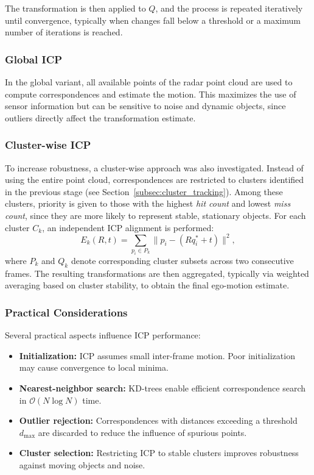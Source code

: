 The transformation is then applied to $Q$, and the process is repeated iteratively until convergence, typically when changes fall below a threshold or a maximum number of iterations is reached.

\subsubsection*{Global ICP}
In the global variant, all available points of the radar point cloud are used to compute correspondences and estimate the motion. 
This maximizes the use of sensor information but can be sensitive to noise and dynamic objects, since outliers directly affect the transformation estimate.

\subsubsection*{Cluster-wise ICP}
To increase robustness, a cluster-wise approach was also investigated. 
Instead of using the entire point cloud, correspondences are restricted to clusters identified in the previous stage (see Section~\ref{subsec:cluster_tracking}). 
Among these clusters, priority is given to those with the highest \emph{hit count} and lowest \emph{miss count}, since they are more likely to represent stable, stationary objects. 
For each cluster $C_k$, an independent ICP alignment is performed:
\begin{equation}
    E_k(R,t) = \sum_{p_i \in P_k} \lVert p_i - (R q^*_i + t) \rVert^2,
\end{equation}
where $P_k$ and $Q_k$ denote corresponding cluster subsets across two consecutive frames.
The resulting transformations are then aggregated, typically via weighted averaging based on cluster stability, to obtain the final ego-motion estimate.

\subsubsection*{Practical Considerations}
Several practical aspects influence ICP performance:
\begin{itemize}
    \item \textbf{Initialization:} ICP assumes small inter-frame motion. Poor initialization may cause convergence to local minima.
    \item \textbf{Nearest-neighbor search:} KD-trees enable efficient correspondence search in $\mathcal{O}(N \log N)$ time.
    \item \textbf{Outlier rejection:} Correspondences with distances exceeding a threshold $d_{\max}$ are discarded to reduce the influence of spurious points.
    \item \textbf{Cluster selection:} Restricting ICP to stable clusters improves robustness against moving objects and noise.
\end{itemize}
